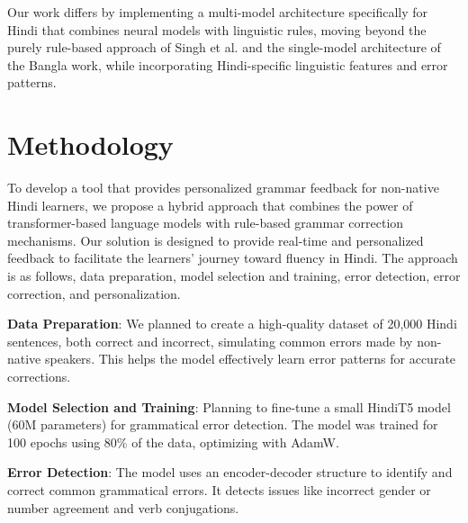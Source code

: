 \documentclass[11pt,a4paper]{article}
\begin{document}
Our work differs by implementing a multi-model architecture specifically for Hindi that combines neural models with linguistic rules, moving beyond the purely rule-based approach of Singh et al. and the single-model architecture of the Bangla work, while incorporating Hindi-specific linguistic features and error patterns.

\section{Methodology}


To develop a tool that provides personalized grammar feedback for non-native Hindi learners, we propose a hybrid approach that combines the power of transformer-based language models with rule-based grammar correction mechanisms. Our solution is designed to provide real-time and personalized feedback to facilitate the learners' journey toward fluency in Hindi. The approach is as follows, data preparation, model selection and training, error detection, error correction, and personalization.

\textbf{Data Preparation}: We planned to create a high-quality dataset of 20,000 Hindi sentences, both correct and incorrect, simulating common errors made by non-native speakers. This helps the model effectively learn error patterns for accurate corrections.

\textbf{Model Selection and Training}: Planning to fine-tune a small HindiT5 model (60M parameters)
for grammatical error detection. The model was trained for 100 epochs using 80\% of the data, optimizing with AdamW.

\textbf{Error Detection}: The model uses an encoder-decoder structure to identify and correct common grammatical errors. It detects issues like incorrect gender or number agreement and verb conjugations.
\end{document}

